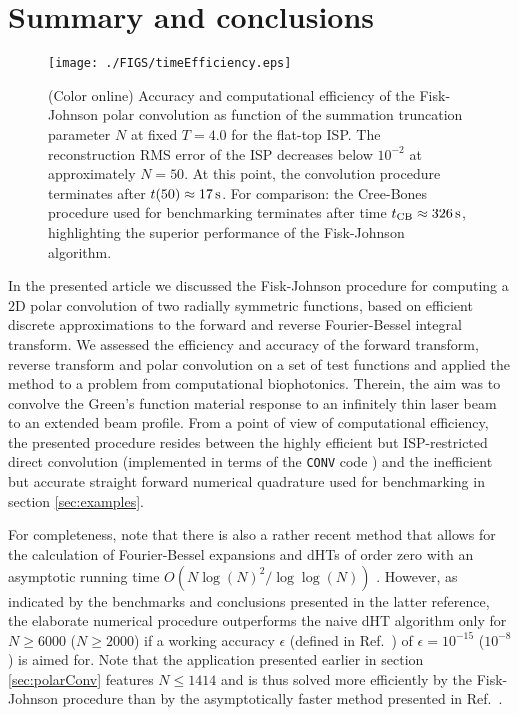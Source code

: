 \documentclass[12pt]{iopart}
\begin{document}

\section{Summary and conclusions}
\label{sec:fin}

%
%
\begin{figure}[t!]
\centerline{\texttt{[image: ./FIGS/timeEfficiency.eps]} } 
\caption{(Color online) Accuracy and computational efficiency of the Fisk-Johnson
polar convolution as function of the summation truncation parameter $N$ at
fixed $T=4.0$ for the flat-top ISP. The reconstruction RMS error of the ISP
decreases below $10^{-2}$ at approximately $N=50$. At this point, the 
convolution procedure terminates after $t(50)\approx 17\,{\rm{s}}$. For 
comparison: the Cree-Bones procedure used for benchmarking terminates after
time $t_{\rm{CB}}\approx 326\,{\rm{s}}$, highlighting the superior performance 
of the Fisk-Johnson algorithm.
}
\label{fig:timeEfficiency}
\end{figure}

In the presented article we discussed the Fisk-Johnson procedure for computing
a $2$D polar convolution of two radially symmetric functions, based on
efficient discrete approximations to the forward and reverse Fourier-Bessel
integral transform. 
We assessed the efficiency and accuracy of the forward transform, reverse
transform and polar convolution on a set of test functions and applied the
method to a problem from computational biophotonics. Therein, the aim was to
convolve the Green's function material response to an infinitely thin laser
beam to an extended beam profile.
From a point of view of computational efficiency, the presented procedure 
resides between the highly efficient but ISP-restricted direct convolution
(implemented in terms of the {\tt CONV} code \cite{CONV:1997}) and the 
inefficient but accurate straight forward numerical quadrature used for 
benchmarking in section \ref{sec:examples}.

For completeness, note that there is also a rather recent method that allows
for the calculation of Fourier-Bessel expansions and dHTs of order zero with an
asymptotic running time $O(N \log(N)^2/\log\log(N))$ \cite{Townsend:2015}.
However, as indicated by the benchmarks and conclusions presented in the
latter reference, the elaborate numerical procedure outperforms the naive dHT
algorithm only for $N\geq 6000$ ($N\geq 2000$) if a working accuracy $\epsilon$
(defined in Ref.\ \cite{Townsend:2015}) of $\epsilon = 10^{-15}$ ($10^{-8}$) is
aimed for. 
Note that the application presented earlier in section \ref{sec:polarConv}
features $N\leq 1414$ and is thus solved more efficiently by the Fisk-Johnson
procedure than by the asymptotically faster method presented in Ref.\
\cite{Townsend:2015}.
\end{document}
